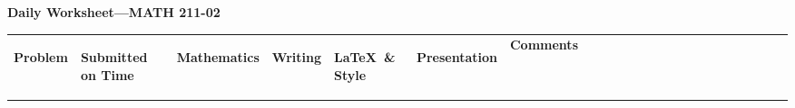 \documentclass[landscape]{article}
\begin{document}
\thispagestyle{empty}

\begin{center}
    \Large\textbf{Daily Worksheet—MATH 211-02}
\end{center}

\vspace{0.25cm}

\setlength{\tabcolsep}{4pt}
\renewcommand{\arraystretch}{1.5}
\newcommand{\gray}{\cellcolor{gray!20}}

\noindent
\begin{tabular}{|
>{\centering\arraybackslash}m{1.5 cm}|
>{\centering\arraybackslash}m{0.35cm}|
>{\centering\arraybackslash}m{0.35cm}|
>{\centering\arraybackslash}m{0.35cm}|
>{\centering\arraybackslash}m{0.35cm}|
>{\centering\arraybackslash}m{0.35cm}|
>{\arraybackslash}m{9.5cm}|
>{\centering\arraybackslash}m{0.35cm}|%
>{\centering\arraybackslash}m{0.35cm}|%
>{\centering\arraybackslash}m{0.35cm}|%
>{\centering\arraybackslash}m{0.35cm}|%
>{\centering\arraybackslash}m{0.35cm}|%
>{\centering\arraybackslash}m{0.35cm}|%
>{\centering\arraybackslash}m{0.35cm}|%
>{\centering\arraybackslash}m{0.35cm}|%
>{\centering\arraybackslash}m{0.35cm}|%
>{\centering\arraybackslash}m{0.35cm}|%
>{\centering\arraybackslash}m{0.35cm}|%
>{\centering\arraybackslash}m{0.35cm}|%
>{\centering\arraybackslash}m{0.35cm}|%
>{\centering\arraybackslash}m{0.35cm}|%
>{\centering\arraybackslash}m{0.35cm}|%
>{\centering\arraybackslash}m{0.35cm}|%
}
\hline
\multicolumn{7}{|c|}{\textbf{Presenters}} & \multicolumn{16}{c|}{\textbf{Contributors}} \\
\hline
\begin{turn}{90}\textbf{Problem}\end{turn} &
\begin{turn}{90}\textbf{Submitted on Time ~}\end{turn} &
\begin{turn}{90}\textbf{Mathematics}\end{turn} &
\begin{turn}{90}\textbf{Writing}\end{turn} &
\begin{turn}{90}\textbf{\LaTeX\ \& Style}\end{turn} &
\begin{turn}{90}\textbf{Presentation}\end{turn} &
\parbox[c][1.5cm][c]{8cm}{\centering\textbf{Comments}} &

\end{tabular}
\end{document}
